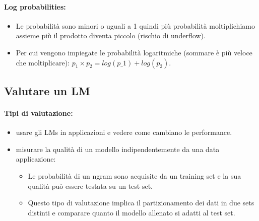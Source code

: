 
\paragraph{Log probabilities:}

\begin{itemize}
  \item Le probabilità sono minori o uguali a 1 quindi più probabilità moltiplichiamo assieme più il prodotto diventa piccolo (rischio di underflow). 
  \item Per cui vengono impiegate le probabilità logaritmiche (sommare è più veloce che moltiplicare): $p_1 \times p_2 = log(p\_1) + log(p_2)$.
\end{itemize}

\subsection{Valutare un LM}

\paragraph{Tipi di valutazione:}

\begin{itemize}
  \item {} usare gli LMs in applicazioni e vedere come cambiano le performance. 
  \item {} misurare la qualità di un modello indipendentemente da una data applicazione: 
    \begin{itemize}
      \item Le probabilità di un ngram sono acquisite da un training set e la sua qualità può essere testata su un test set. 
      \item Questo tipo di valutazione implica il partizionamento dei dati in due sets distinti e comparare quanto il modello allenato si adatti al test set.
    \end{itemize}
\end{itemize}


